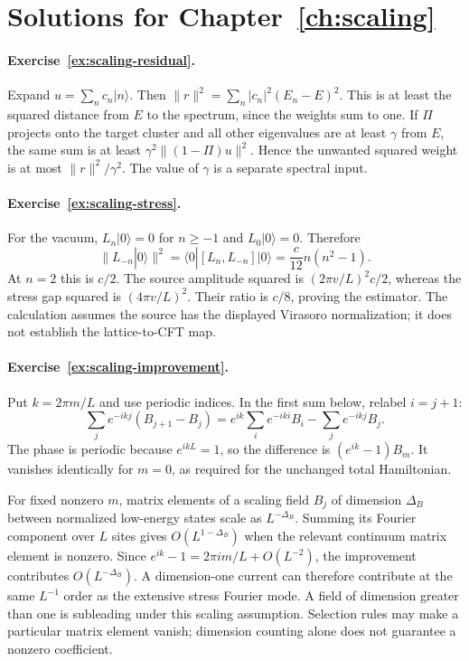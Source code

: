 \section{Solutions for Chapter~\ref{ch:scaling}}

\paragraph{Exercise~\ref{ex:scaling-residual}.}
\label{sol:ex:scaling-residual}
Expand $u=\sum_nc_n|n\rangle$. Then
$\|r\|^2=\sum_n|c_n|^2(E_n-E)^2$. This is at least the squared
distance from $E$ to the spectrum, since the weights sum to one.
If $\Pi$ projects onto the target cluster and all other eigenvalues
are at least $\gamma$ from $E$, the same sum is at least
$\gamma^2\|(1-\Pi)u\|^2$. Hence the unwanted squared weight is
at most $\|r\|^2/\gamma^2$. The value of $\gamma$ is a separate
spectral input.



\paragraph{Exercise~\ref{ex:scaling-stress}.}
\label{sol:ex:scaling-stress}
For the vacuum, $L_n|0\rangle=0$ for $n\geq-1$ and
$L_0|0\rangle=0$. Therefore
\[
 \|L_{-n}|0\rangle\|^2
 =\langle0|[L_n,L_{-n}]|0\rangle
 =\frac c{12}n(n^2-1).
\]
At $n=2$ this is $c/2$. The source amplitude squared is
$(2\pi v/L)^2c/2$, whereas the stress gap squared is
$(4\pi v/L)^2$. Their ratio is $c/8$, proving the estimator.
The calculation assumes the source has the displayed Virasoro
normalization; it does not establish the lattice-to-CFT map.



\paragraph{Exercise~\ref{ex:scaling-improvement}.}
\label{sol:ex:scaling-improvement}
Put $k=2\pi m/L$ and use periodic indices. In the first sum
below, relabel $i=j+1$:
\[
 \sum_j e^{-ikj}(B_{j+1}-B_j)
 =e^{ik}\sum_i e^{-iki}B_i-\sum_j e^{-ikj}B_j.
\]
The phase is periodic because $e^{ikL}=1$, so the difference
is $(e^{ik}-1)B_m$. It vanishes identically for $m=0$, as
required for the unchanged total Hamiltonian.

For fixed nonzero $m$, matrix elements of a scaling field
$B_j$ of dimension $\Delta_B$ between normalized low-energy
states scale as $L^{-\Delta_B}$. Summing its Fourier component
over $L$ sites gives $O(L^{1-\Delta_B})$ when the relevant
continuum matrix element is nonzero. Since
$e^{ik}-1=2\pi i m/L+O(L^{-2})$, the improvement contributes
$O(L^{-\Delta_B})$. A dimension-one current can therefore
contribute at the same $L^{-1}$ order as the extensive stress
Fourier mode. A field of dimension greater than one is
subleading under this scaling assumption. Selection rules may
make a particular matrix element vanish; dimension counting
alone does not guarantee a nonzero coefficient.



